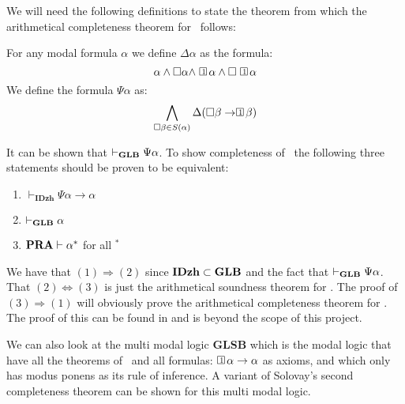 \documentclass[../main.tex]{subfiles}
\begin{document}
We will need the following definitions to state the theorem from which the
arithmetical completeness theorem for \GLB\ follows:
\begin{defi}
	For any modal formula $\alpha$ we define $\Delta\alpha$ as the formula:
	\[\alpha\wedge\Box\alpha\wedge\OneBox\alpha\wedge\Box\OneBox\alpha\]
	We define the formula $\Psi\alpha$ as:
	\[\bigwedge_{\Box\beta\in
	S(\alpha)}\Delta(\Box\beta\rightarrow\OneBox\beta)\]
\end{defi}
It can be shown that $\vdash_{\text{\textbf{GLB}}}\Psi\alpha$.
To show completeness of \GLB\ the following three statements should be proven to
be equivalent:
\begin{enumerate}
	\item $\vdash_{\textbf{IDzh}}\Psi\alpha\rightarrow\alpha$
	\item $\vdash_{\text{\textbf{GLB}}}\alpha$
	\item $\text{\textbf{PRA}}\vdash\alpha^*$ for all $^*$
\end{enumerate}
We have that $(1)\Rightarrow (2)$ since $\text{\textbf{IDzh}}\subset\text{\textbf{GLB}}$ and the fact that
$\vdash_{\text{\textbf{GLB}}}\Psi\alpha$. That $(2)\Leftrightarrow(3)$ is just the arithmetical
soundness theorem for \GLB. The proof of $(3)\Rightarrow(1)$ will obviously
prove the arithmetical completeness theorem for \GLB.
The proof of this can be found in \citet{Boolos1993} and is beyond the scope of
this project.

We can also look at the multi modal logic \textbf{GLSB} which is the modal logic that have all
the theorems of \GLB\  and all formulas:
$\OneBox\alpha\rightarrow\alpha$ as axioms, and which only has modus ponens as
its rule of inference. A variant of Solovay's second completeness theorem can
be shown for this multi modal logic.
\end{document}

